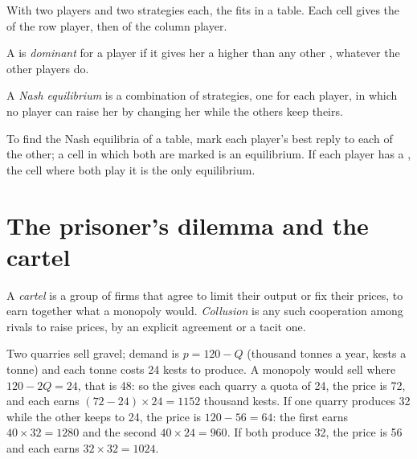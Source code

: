 With two players and two strategies each, the  fits in a table. Each cell gives the  of the row player, then of the column player.

\begin{definition}\label{def:g11:oligopoly-and-games:dominant-strategy}
A  is \emph{dominant} for a player if it gives her a higher  than any other , whatever the other players do.
\end{definition}

\begin{definition}\label{def:g11:oligopoly-and-games:nash}
A \emph{Nash equilibrium} is a combination of strategies, one for each player, in which no player can raise her  by changing her
 while the others keep theirs.
\end{definition}

To find the Nash equilibria of a table, mark each player's best reply to each  of the other; a cell in which both  are marked is an equilibrium.
If each player has a , the cell where both play it is the only equilibrium.

\section{The prisoner's dilemma and the cartel}\label{sec:g11:oligopoly-and-games:cartel}

\begin{definition}\label{def:g11:oligopoly-and-games:cartel}
A \emph{cartel} is a group of firms that agree to limit their output or fix their prices, to earn together what a monopoly would.
\emph{Collusion}\label{def:g11:oligopoly-and-games:collusion} is any such cooperation among rivals to raise prices, by an
explicit agreement or a tacit one.
\end{definition}

\begin{example}\label{ex:g11:oligopoly-and-games:quarries}
Two quarries sell gravel; demand is $p = 120 - Q$ (thousand tonnes a year, kests a tonne) and each tonne costs 24 kests to produce. A monopoly would sell where $120 -
2Q = 24$, that is 48: so the  gives each quarry a quota of 24, the price is 72, and each earns $(72 - 24) \times 24 = 1152$ thousand kests. If one quarry
produces 32 while the other keeps to 24, the price is $120 - 56 = 64$: the first earns $40 \times 32 = 1280$ and the second $40 \times 24 = 960$. If both produce 32,
the price is 56 and each earns $32 \times 32 = 1024$.
\end{example}

